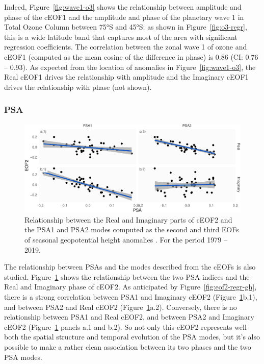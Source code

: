 \documentclass[smallextended]{svjour3}       %
\begin{document}
Indeed, Figure~\ref{fig:wave1-o3} shows the relationship between amplitude and phase of the cEOF1 and the amplitude and phase of the planetary wave 1 in Total Ozone Column between 75°S and 45°S; as shown in Figure~\ref{fig:o3-regr}, this is a wide latitude band that captures most of the area with significant regression coefficients. The correlation between the zonal wave 1 of ozone and cEOF1 (computed as the mean cosine of the difference in phase) is 0.86 (CI: 0.76 -- 0.93). As expected from the location of anomalies in Figure~\ref{fig:wave1-o3}, the Real cEOF1 drives the relationship with amplitude and the Imaginary cEOF1 drives the relationship with phase (not shown).

\hypertarget{psa}{%
\subsubsection{PSA}\label{psa}}



\begin{figure}
\includegraphics{../figures/psa-eof2-1} \caption{Relationship between the Real and Imaginary parts of cEOF2 and the PSA1 and PSA2 modes computed as the second and third EOFs of seasonal geopotential height anomalies \citep{mo2001}. For the period 1979 -- 2019.}\label{fig:psa-eof2}
\end{figure}

The relationship between PSAs and the modes described from the cEOFs is also studied. Figure~\ref{fig:psa-eof2} shows the relationship between the two PSA indices and the Real and Imaginary phase of cEOF2. As anticipated by Figure~\ref{fig:eof2-regr-gh}, there is a strong correlation between PSA1 and Imaginary cEOF2 (Figure~\ref{fig:psa-eof2}b.1), and between PSA2 and Real cEOF2 (Figure~\ref{fig:psa-eof2}a.2). Conversely, there is no relationship between PSA1 and Real cEOF2, and between PSA2 and Imaginary cEOF2 (Figure~\ref{fig:psa-eof2} panels a.1 and b.2). So not only this cEOF2 represents well both the spatial structure and temporal evolution of the PSA modes, but it's also possible to make a rather clean association between its two phases and the two PSA modes.
\end{document}
